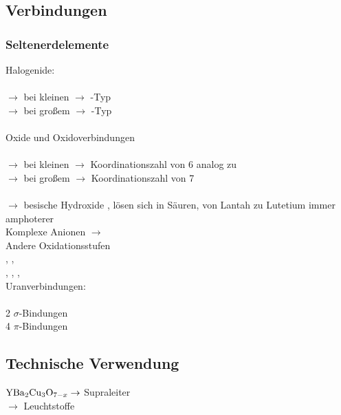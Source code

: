 \documentclass[a4paper, fleqn]{article}
\begin{document}
\subsection{Verbindungen}
\subsubsection{Seltenerdelemente}
Halogenide:\\
\\
$\rightarrow$ bei kleinen  $\rightarrow$ -Typ\\
$\rightarrow$ bei großem  $\rightarrow$ -Typ\\\\
Oxide und Oxidoverbindungen\\
\\
$\rightarrow$ bei kleinen  $\rightarrow$ Koordinationszahl von 6 analog zu \\
$\rightarrow$ bei großem  $\rightarrow$ Koordinationszahl von 7\\\\
 $\rightarrow$ besische Hydroxide , lösen sich in Säuren, von Lantah zu Lutetium immer amphoterer\\
Komplexe Anionen $\rightarrow$\\
Andere Oxidationsstufen\\
, , \\
, , , \\
Uranverbindungen:\\
\\
2 $\sigma$-Bindungen\\
4 $\pi$-Bindungen

\subsection{Technische Verwendung}
$\ce{YBa2Cu3O_{7-x}} \rightarrow$ Supraleiter\\
 $\rightarrow$ Leuchtstoffe
\end{document}
